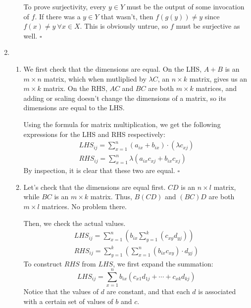 \documentclass[12pt]{article}
\begin{document}
\begin{enumerate}
\begin{enumerate}
                        To prove surjectivity, every $y \in Y$ must be the output of some invocation of $f$.
                        If there was a $y \in Y$ that wasn't, then $f(g(y)) \ne y$ since $f(x) \ne y\ \forall x \in X$.
                        This is obviously untrue, so $f$ must be surjective as well. $\square$ \label{list:surjective}
            \end{enumerate}
      \item \begin{enumerate}
                  \item We first check that the dimensions are equal.
                        On the LHS, $A+B$ is an $m \times n$ matrix, which when mutliplied by $\lambda C$,
                        an $n \times k$ matrix, gives us an $m \times k$ matrix.
                        On the RHS, $AC$ and $BC$ are both $m \times k$ matrices,
                        and adding or scaling doesn't change the dimensions of a matrix,
                        so its dimensions are equal to the LHS.

                        Using the formula for matrix multiplication, we get the following expressions for the LHS and RHS respectively:
                        \begin{gather*}
                              LHS_{ij}=\sum_{x=1}^n (a_{ix}+b_{ix}) \cdot (\lambda c_{xj}) \\
                              RHS_{ij}=\sum_{x=1}^n \lambda (a_{ix}c_{xj}+b_{ix}c_{xj})
                        \end{gather*}
                        By inspection, it is clear that these two are equal. $\square$
                  \item Let's check that the dimensions are equal first.
                        $CD$ is an $n \times l$ matrix, while $BC$ is an $m \times k$ matrix.
                        Thus, $B(CD)$ and $(BC)D$ are both $m \times l$ matrices.
                        No problem there.

                        Then, we check the actual values.
                        \begin{gather*}
                              LHS_{ij}=\sum_{x=1}^n \left(b_{ix}\sum_{y=1}^k (c_{xy}d_{yj})\right) \\
                              RHS_{ij}=\sum_{y=1}^k \left(\sum_{x=1}^n (b_{ix}c_{xy}) \cdot d_{yj}\right)
                        \end{gather*}
                        To construct $RHS$ from $LHS$, we first expand the summation:
                        \[LHS_{ij}=\sum_{x=1}^n b_{ix}(c_{x1}d_{1j}+ \cdots +c_{xk}d_{kj})\]
                        Notice that the values of $d$ are constant, and that each $d$ is associated
                        with a certain set of values of $b$ and $c$.


\end{enumerate}
\end{enumerate}
\end{document}
